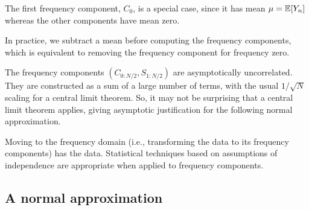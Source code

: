 \begin{frame}[fragile]

\bi

\item  The first frequency component, $C_0$, is a special case, since it has mean $\mu=\mathbb{E}[Y_n]$ whereas the other components have mean zero.

\item  In practice, we subtract a mean before computing the frequency components, which is equivalent to removing the frequency component for frequency zero.

\item  The frequency components $(C_{0:N/2},S_{1:N/2})$ are asymptotically uncorrelated. They are constructed as a sum of a large number of terms, with the usual  $1/\sqrt{N}$ scaling for a central limit theorem. So, it may not be surprising that a central limit theorem applies, giving asymptotic justification for the following normal approximation. 

\item  Moving to the frequency domain (i.e., transforming the data to its frequency components) has  the data. Statistical techniques based on assumptions of independence are appropriate when applied to frequency components.
\ei

\end{frame}

\subsection{ A normal approximation}


